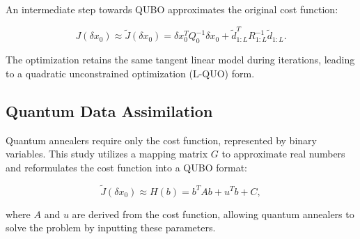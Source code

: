 \documentclass{article}
\begin{document}
An intermediate step towards QUBO approximates the original cost function:

\[
J (\delta x_0) \approx \tilde{J}(\delta x_0) = \delta x_0^T Q_0^{-1} \delta x_0 + \tilde{d}_{1:L}^T R_{1:L}^{-1} \tilde{d}_{1:L}.
\]

The optimization retains the same tangent linear model during iterations, leading to a quadratic unconstrained optimization (L-QUO) form.

\subsection{Quantum Data Assimilation}

Quantum annealers require only the cost function, represented by binary variables. This study utilizes a mapping matrix \( G \) to approximate real numbers and reformulates the cost function into a QUBO format:

\[
\tilde{J}(\delta x_0) \approx H(b) = b^T A b + u^T b + C,
\]

where \( A \) and \( u \) are derived from the cost function, allowing quantum annealers to solve the problem by inputting these parameters.
\end{document}
